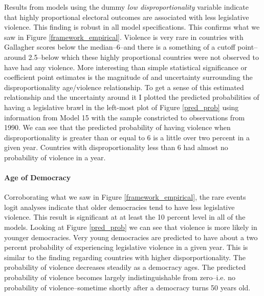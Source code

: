 \documentclass[a4paper]{article}\usepackage{graphicx, color}
\begin{document}
Results from models using the dummy {\emph{low disproportionality}} variable indicate that highly proportional electoral outcomes are associated with less legislative violence. This finding is robust in all model specifications. This confirms what we saw in Figure \ref{framework_empirical}. Violence is very rare in countries with Gallagher scores below the median--6--and there is a something of a cutoff point--around 2.5--below which these highly proportional countries were not observed to have had any violence. More interesting than simple statistical significance or coefficient point estimates is the magnitude of and uncertainty surrounding the disproportionality age/violence relationship. To get a sense of this estimated relationship and the uncertainty around it \citep[see][]{King2000} I plotted the predicted probabilities of having a legislative brawl in the left-most plot of Figure \ref{pred_prob} using information from Model 15 with the sample constricted to observations from 1990. We can see that the predicted probability of having violence when disproportionality is greater than or equal to 6 is a little over two percent in a given year. Countries with disproportionality less than 6 had almost no probability of violence in a year.

\paragraph{Age of Democracy}

Corroborating what we saw in Figure \ref{framework_empirical}, the rare events logit analyses indicate that older democracies tend to have less legislative violence. This result is significant at at least the 10 percent level in all of the models. Looking at Figure \ref{pred_prob} we can see that violence is more likely in younger democracies. Very young democracies are predicted to have about a two percent probability of experiencing legislative violence in a given year. This is similar to the finding regarding countries with higher disporportionality. The probability of violence decreases steadily as a democracy ages. The predicted probability of violence becomes largely indistinguishable from zero--i.e. no probability of violence--sometime shortly after a democracy turns 50 years old.
\end{document}
